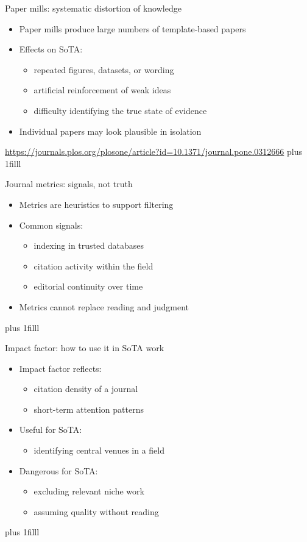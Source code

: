 \documentclass[aspectratio=169]{beamer}
\newcommand{\btVFill}{\vskip0pt plus 1filll}
\begin{document}
\begin{frame}{Paper mills: systematic distortion of knowledge}
  \begin{itemize}
    \item Paper mills produce large numbers of template-based papers
    \item Effects on SoTA:
      \begin{itemize}
        \item repeated figures, datasets, or wording
        \item artificial reinforcement of weak ideas
        \item difficulty identifying the true state of evidence
      \end{itemize}
    \item Individual papers may look plausible in isolation
  \end{itemize}
  \bigskip
  \url{https://journals.plos.org/plosone/article?id=10.1371/journal.pone.0312666}
\btVFill
\end{frame}

\begin{frame}{Journal metrics: signals, not truth}
  \begin{itemize}
    \item Metrics are heuristics to support filtering
    \item Common signals:
      \begin{itemize}
        \item indexing in trusted databases
        \item citation activity within the field
        \item editorial continuity over time
      \end{itemize}
    \item Metrics cannot replace reading and judgment
  \end{itemize}
\btVFill
\end{frame}

\begin{frame}{Impact factor: how to use it in SoTA work}
  \begin{itemize}
    \item Impact factor reflects:
      \begin{itemize}
        \item citation density of a journal
        \item short-term attention patterns
      \end{itemize}
    \item Useful for SoTA:
      \begin{itemize}
        \item identifying central venues in a field
      \end{itemize}
    \item Dangerous for SoTA:
      \begin{itemize}
        \item excluding relevant niche work
        \item assuming quality without reading
      \end{itemize}
  \end{itemize}
\btVFill
\end{frame}
\end{document}
